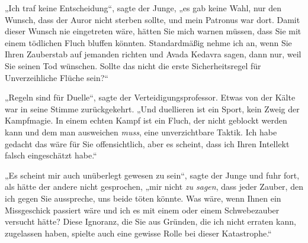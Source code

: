 „Ich traf keine Entscheidung“, sagte der Junge, „es gab keine Wahl, nur den Wunsch, dass der Auror nicht sterben sollte, und mein Patronus war dort. Damit dieser Wunsch nie eingetreten wäre, hätten Sie mich warnen müssen, dass Sie mit einem tödlichen Fluch bluffen könnten. Standardmäßig nehme ich an, wenn Sie Ihren Zauberstab auf jemanden richten und Avada Kedavra sagen, dann nur, weil Sie seinen Tod wünschen. Sollte das nicht die erste Sicherheitsregel für Unverzeihliche Flüche sein?“

„Regeln sind für Duelle“, sagte der Verteidigungsprofessor. Etwas von der Kälte war in seine Stimme zurückgekehrt. „Und duellieren ist ein Sport, kein Zweig der Kampfmagie. In einem echten Kampf ist ein Fluch, der nicht geblockt werden kann und dem man ausweichen \emph{muss}, eine unverzichtbare Taktik. Ich habe gedacht das wäre für Sie offensichtlich, aber es scheint, dass ich Ihren Intellekt falsch eingeschätzt habe.“

„Es scheint mir auch unüberlegt gewesen zu sein“, sagte der Junge und fuhr fort, als hätte der andere nicht gesprochen, „mir nicht \emph{zu sagen}, dass jeder Zauber, den ich gegen Sie ausspreche, uns beide töten könnte. Was wäre, wenn Ihnen ein Missgeschick passiert wäre und ich es mit einem  oder einem Schwebezauber versucht hätte? Diese Ignoranz, die Sie aus Gründen, die ich nicht erraten kann, zugelassen haben, spielte auch eine gewisse Rolle bei dieser Katastrophe.“

